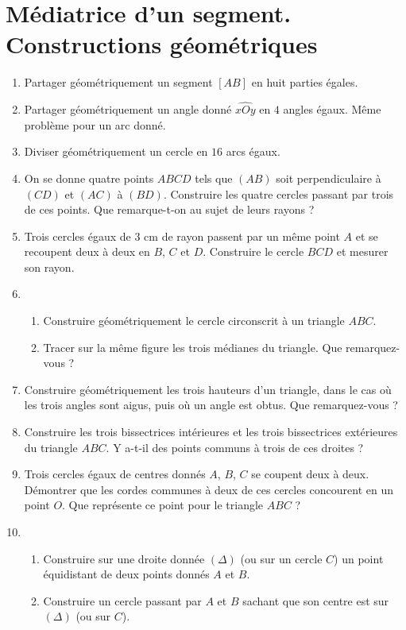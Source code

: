 \documentclass[12 pt]{report}
\theoremstyle{plain}
\newcounter{n}
\begin{document}
\chapter{Médiatrice d'un segment. Constructions géométriques}
\begin{enumerate}
\item Partager géométriquement un segment $[AB]$ en huit parties égales. 
\item Partager géométriquement un angle donné $\widehat{xOy}$ en $4$ angles égaux. Même problème pour un arc donné. 
\item Diviser géométriquement un cercle en $16$ arcs égaux. 
\item On se donne quatre points $ABCD$ tels que $(AB)$ soit perpendiculaire à $(CD)$ et $(AC)$ à $(BD)$. Construire les quatre cercles passant par trois de ces points.
Que remarque-t-on au sujet de leurs rayons ?
\item Trois cercles égaux de $3$ cm de rayon passent par un même point $A$ et 
se recoupent deux à deux en $B$, $C$ et $D$. Construire le cercle $BCD$ et mesurer
son rayon. 
\item \begin{enumerate}
\item Construire géométriquement le cercle circonscrit à un triangle $ABC$. 
\item Tracer sur la même figure les trois médianes du triangle. Que remarquez-vous ?
\end{enumerate}
\item Construire géométriquement les trois hauteurs d'un triangle, dans le cas où les trois angles sont aigus, puis où un angle est obtus. Que remarquez-vous ? 
\item Construire les trois bissectrices intérieures et les trois bissectrices extérieures du triangle $ABC$. Y a-t-il des points communs à trois de ces droites ?
\item Trois cercles égaux de centres donnés $A$, $B$, $C$ se coupent deux à deux. 
Démontrer que les cordes communes à deux de ces cercles concourent en un point $O$. 
Que représente ce point pour le triangle $ABC$ ? 
\item 
\begin{enumerate}
\item Construire sur une droite donnée $(\Delta)$ (ou sur un cercle $C$) un point équidistant de deux points donnés $A$ et $B$. 
\item Construire un cercle passant par $A$ et $B$ sachant que son centre est sur $(\Delta)$ (ou sur $C$).

\end{enumerate}
\end{enumerate}
\end{document}
